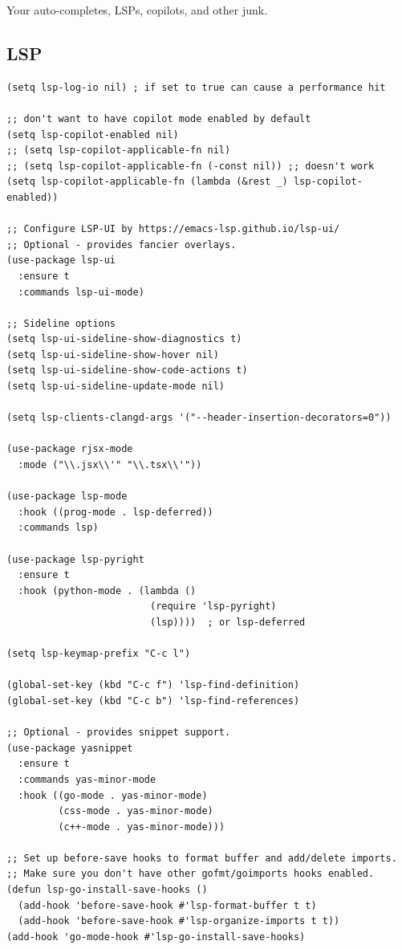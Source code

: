 \documentclass[10pt]{article}
\begin{document}
Your auto-completes, LSPs, copilots, and other junk.
\subsection{LSP}
\label{sec:org1cc25af}
\begin{verbatim}
(setq lsp-log-io nil) ; if set to true can cause a performance hit

;; don't want to have copilot mode enabled by default
(setq lsp-copilot-enabled nil)
;; (setq lsp-copilot-applicable-fn nil)
;; (setq lsp-copilot-applicable-fn (-const nil)) ;; doesn't work
(setq lsp-copilot-applicable-fn (lambda (&rest _) lsp-copilot-enabled))

;; Configure LSP-UI by https://emacs-lsp.github.io/lsp-ui/
;; Optional - provides fancier overlays.
(use-package lsp-ui
  :ensure t
  :commands lsp-ui-mode)

;; Sideline options
(setq lsp-ui-sideline-show-diagnostics t)
(setq lsp-ui-sideline-show-hover nil)
(setq lsp-ui-sideline-show-code-actions t)
(setq lsp-ui-sideline-update-mode nil)

(setq lsp-clients-clangd-args '("--header-insertion-decorators=0"))

(use-package rjsx-mode
  :mode ("\\.jsx\\'" "\\.tsx\\'"))

(use-package lsp-mode
  :hook ((prog-mode . lsp-deferred))
  :commands lsp)

(use-package lsp-pyright
  :ensure t
  :hook (python-mode . (lambda ()
                         (require 'lsp-pyright)
                         (lsp))))  ; or lsp-deferred

(setq lsp-keymap-prefix "C-c l")

(global-set-key (kbd "C-c f") 'lsp-find-definition)
(global-set-key (kbd "C-c b") 'lsp-find-references)

;; Optional - provides snippet support.
(use-package yasnippet
  :ensure t
  :commands yas-minor-mode
  :hook ((go-mode . yas-minor-mode)
         (css-mode . yas-minor-mode)
         (c++-mode . yas-minor-mode)))

;; Set up before-save hooks to format buffer and add/delete imports.
;; Make sure you don't have other gofmt/goimports hooks enabled.
(defun lsp-go-install-save-hooks ()
  (add-hook 'before-save-hook #'lsp-format-buffer t t)
  (add-hook 'before-save-hook #'lsp-organize-imports t t))
(add-hook 'go-mode-hook #'lsp-go-install-save-hooks)


\end{verbatim}
\end{document}
